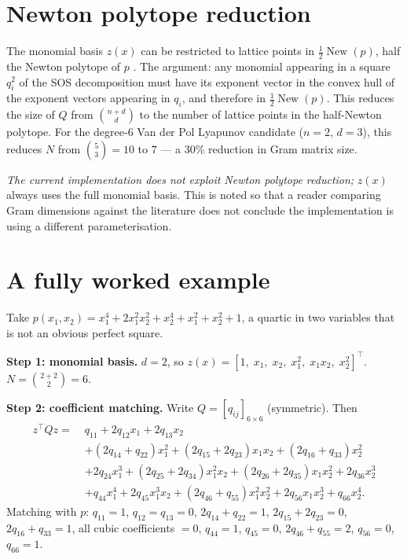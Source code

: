 \documentclass[11pt]{article}
\begin{document}
\section{Newton polytope reduction}
The monomial basis $z(x)$ can be restricted to lattice points in
$\frac{1}{2}\operatorname{New}(p)$, half the Newton polytope of $p$
\cite{Reznick1978}. The argument: any monomial appearing in a square $q_i^2$
of the SOS decomposition must have its exponent vector in the convex hull
of the exponent vectors appearing in $q_i$, and therefore in
$\frac{1}{2}\operatorname{New}(p)$. This reduces the size of $Q$ from
$\binom{n+d}{d}$ to the number of lattice points in the half-Newton
polytope. For the degree-6 Van der Pol Lyapunov candidate ($n=2$,
$d=3$), this reduces $N$ from $\binom{5}{3}=10$ to $7$ --- a 30\% reduction
in Gram matrix size.

\emph{The current implementation does not exploit Newton polytope reduction;}
$z(x)$ always uses the full monomial basis. This is noted so that a reader
comparing Gram dimensions against the literature does not conclude the
implementation is using a different parameterisation.

\section{A fully worked example}
Take $p(x_1, x_2) = x_1^4 + 2x_1^2 x_2^2 + x_2^4 + x_1^2 + x_2^2 + 1$,
a quartic in two variables that is not an obvious perfect square.

\medskip\noindent\textbf{Step 1: monomial basis.}
$d = 2$, so $z(x) = [1,\; x_1,\; x_2,\; x_1^2,\; x_1 x_2,\; x_2^2]^\top$.
$N = \binom{2+2}{2} = 6$.

\medskip\noindent\textbf{Step 2: coefficient matching.}
Write $Q = [q_{ij}]_{6 \times 6}$ (symmetric). Then
\begin{align*}
  z^\top Q z =\; &q_{11}
    + 2q_{12}x_1 + 2q_{13}x_2 \\
    &+ (2q_{14} + q_{22})x_1^2
    + (2q_{15} + 2q_{23})x_1 x_2
    + (2q_{16} + q_{33})x_2^2 \\
    &+ 2q_{24} x_1^3 + (2q_{25} + 2q_{34})x_1^2 x_2
    + (2q_{26} + 2q_{35})x_1 x_2^2 + 2q_{36}x_2^3 \\
    &+ q_{44}x_1^4 + 2q_{45}x_1^3 x_2
    + (2q_{46} + q_{55})x_1^2 x_2^2
    + 2q_{56}x_1 x_2^3 + q_{66}x_2^4.
\end{align*}
Matching with $p$: $q_{11}=1$, $q_{12}=q_{13}=0$, $2q_{14}+q_{22}=1$,
$2q_{15}+2q_{23}=0$, $2q_{16}+q_{33}=1$, all cubic coefficients $=0$,
$q_{44}=1$, $q_{45}=0$, $2q_{46}+q_{55}=2$, $q_{56}=0$, $q_{66}=1$.
\end{document}
